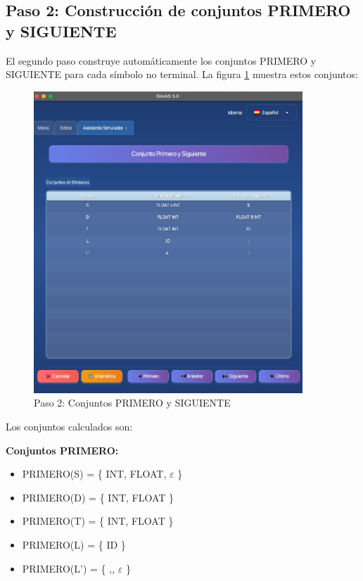 \subsection{Paso 2: Construcción de conjuntos PRIMERO y SIGUIENTE}

El segundo paso construye automáticamente los conjuntos PRIMERO y SIGUIENTE para cada símbolo no terminal. La figura \ref{fig:ejemplo_simulador_paso2} muestra estos conjuntos:

\needspace{8cm}
\begin{figure}[H]
    \centering
    \includegraphics[width=0.9\textwidth]{figuras/ejemplo_practico/simulador_paso2.png}
    \caption{Paso 2: Conjuntos PRIMERO y SIGUIENTE}
    \label{fig:ejemplo_simulador_paso2}
\end{figure}

Los conjuntos calculados son:

\textbf{Conjuntos PRIMERO:}
\begin{itemize}
    \item PRIMERO(S) = \{ INT, FLOAT, $\varepsilon$ \}
    \item PRIMERO(D) = \{ INT, FLOAT \}
    \item PRIMERO(T) = \{ INT, FLOAT \}
    \item PRIMERO(L) = \{ ID \}
    \item PRIMERO(L') = \{ ,, $\varepsilon$ \}
\end{itemize}

